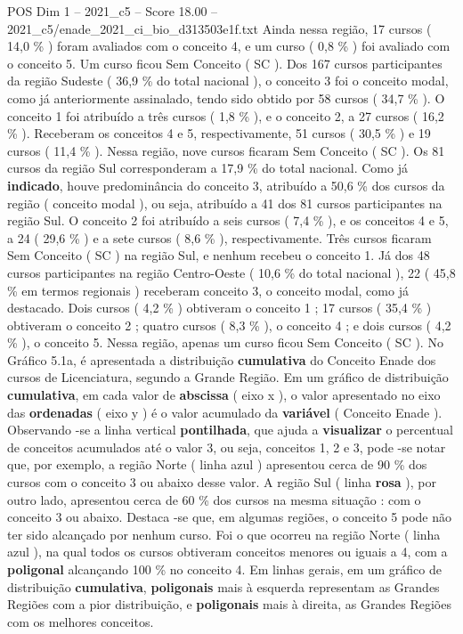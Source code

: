\begin{textsample}{POS Dim 1 – 2021\_c5 – Score 18.00 – 2021\_c5/enade\_2021\_ci\_bio\_d313503e1f.txt}
Ainda nessa região, 17 cursos ( 14,0 \% ) foram avaliados com o conceito 4, e um curso ( 0,8 \% ) foi avaliado com o conceito 5.
Um curso ficou Sem Conceito ( SC ).
Dos 167 cursos participantes da região Sudeste ( 36,9 \% do total nacional ), o conceito 3 foi o conceito modal, como já anteriormente assinalado, tendo sido obtido por 58 cursos ( 34,7 \% ).
O conceito 1 foi atribuído a três cursos ( 1,8 \% ), e o conceito 2, a 27 cursos ( 16,2 \% ).
Receberam os conceitos 4 e 5, respectivamente, 51 cursos ( 30,5 \% ) e 19 cursos ( 11,4 \% ).
Nessa região, nove cursos ficaram Sem Conceito ( SC ).
Os 81 cursos da região Sul corresponderam a 17,9 \% do total nacional.
Como já \textbf{indicado}, houve predominância do conceito 3, atribuído a 50,6 \% dos cursos da região ( conceito modal ), ou seja, atribuído a 41 dos 81 cursos participantes na região Sul.
O conceito 2 foi atribuído a seis cursos ( 7,4 \% ), e os conceitos 4 e 5, a 24 ( 29,6 \% ) e a sete cursos ( 8,6 \% ), respectivamente.
Três cursos ficaram Sem Conceito ( SC ) na região Sul, e nenhum recebeu o conceito 1.
Já dos 48 cursos participantes na região Centro-Oeste ( 10,6 \% do total nacional ), 22 ( 45,8 \% em termos regionais ) receberam conceito 3, o conceito modal, como já destacado.
Dois cursos ( 4,2 \% ) obtiveram o conceito 1 ; 17 cursos ( 35,4 \% ) obtiveram o conceito 2 ; quatro cursos ( 8,3 \% ), o conceito 4 ; e dois cursos ( 4,2 \% ), o conceito 5.
Nessa região, apenas um curso ficou Sem Conceito ( SC ).
No Gráfico 5.1a, é apresentada a distribuição \textbf{cumulativa} do Conceito Enade dos cursos de Licenciatura, segundo a Grande Região.
Em um gráfico de distribuição \textbf{cumulativa}, em cada valor de \textbf{abscissa} ( eixo x ), o valor apresentado no eixo das \textbf{ordenadas} ( eixo y ) é o valor acumulado da \textbf{variável} ( Conceito Enade ).
Observando -se a linha vertical \textbf{pontilhada}, que ajuda a \textbf{visualizar} o percentual de conceitos acumulados até o valor 3, ou seja, conceitos 1, 2 e 3, pode -se notar que, por exemplo, a região Norte ( linha azul ) apresentou cerca de 90 \% dos cursos com o conceito 3 ou abaixo desse valor.
A região Sul ( linha \textbf{rosa} ), por outro lado, apresentou cerca de 60 \% dos cursos na mesma situação : com o conceito 3 ou abaixo.
Destaca -se que, em algumas regiões, o conceito 5 pode não ter sido alcançado por nenhum curso.
Foi o que ocorreu na região Norte ( linha azul ), na qual todos os cursos obtiveram conceitos menores ou iguais a 4, com a \textbf{poligonal} alcançando 100 \% no conceito 4.
Em linhas gerais, em um gráfico de distribuição \textbf{cumulativa}, \textbf{poligonais} mais à esquerda representam as Grandes Regiões com a pior distribuição, e \textbf{poligonais} mais à direita, as Grandes Regiões com os melhores conceitos.

\end{textsample}
